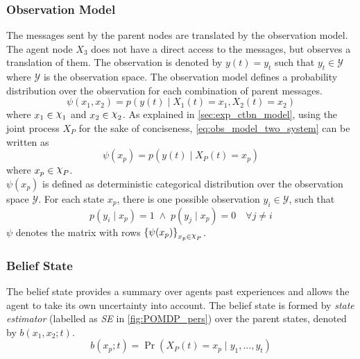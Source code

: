 \subsubsection{Observation Model}
The messages sent by the parent nodes are translated by the observation model. The agent node $ X_3 $ does not have a direct access to the messages, but observes a translation of them. The observation is denoted by $ y(t) = y_t $ such that $ y_t \in \mathcal{Y} $ where $ \mathcal{Y} $ is the observation space. The observation model defines a probability distribution over the observation for each combination of parent messages.
\begin{equation}
\psi(x_1, x_2) = p(y(t) \mid X_{1}(t)=x_1, X_{2}(t)=x_2)
\label{eq:obs_model_two_system}
\end{equation}
where $ x_1 \in \rchi_1 $ and $ x_2 \in \rchi_2 $. As explained in \cref{sec:exp_ctbn_model}, using the joint process $ X_P $ for the sake of conciseness, \autoref{eq:obs_model_two_system} can be written as
\begin{equation}
\psi(x_p) = p(y(t) \mid X_P(t)=x_p)
\label{eq:obs_model_p}
\end{equation}
where $ x_p \in \rchi_P $. \\
$ \psi(x_p) $ is defined as deterministic categorical distribution over the observation space $ \mathcal{Y} $. For each state $ x_p $, there is one possible observation $ y_i \in \mathcal{Y} $, such that \begin{equation}
p(y_i \mid x_p) = 1 \;\wedge \;p(y_j \mid x_p) = 0 \quad \forall j \neq i 
\label{eq:det_cat_dist}
\end{equation} 
$ \psi $ denotes the matrix with rows $ \left\lbrace \psi(x_p)\right\rbrace_{x_p \in \rchi_P} $.
\subsubsection{Belief State}
The belief state provides a summary over agents past experiences and allows the agent to take its own uncertainty into account. The belief state is formed by \textit{state estimator} (labelled as \textit{SE} in \cref{fig:POMDP_pers}) over the parent states, denoted by $  b(x_{1}, x_{2}; t) $. 
\begin{equation}
b(x_p; t) = \operatorname{Pr}( X_P(t) = x_p \mid y_{1}, ..., y_{t})
\end{equation}
